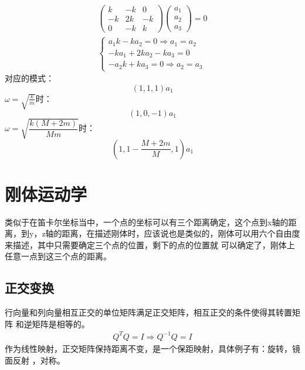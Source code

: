 \documentclass[UTF8,10pt]{article}
\begin{document}
\begin{equation*}
    \begin{array}{l}
        \left(\begin{array}{ccc}
                      k  & -k  & 0  \\
                      -k & 2 k & -k \\
                      0  & -k  & k
                  \end{array}\right)\left(\begin{array}{l}
                                              a_{1} \\
                                              a_{2} \\
                                              a_{3}
                                          \end{array}\right)=0 \\
        \left\{\begin{array}{l}
                   a_{1} k-k a_{2}=0 \Rightarrow a_{1}=a_{2} \\
                   -k a_{1}+2 k a_{2}-k a_{3}=0              \\
                   -a_{2} k+k a_{3}=0 \Rightarrow a_{2}=a_{3}
               \end{array}\right.
    \end{array}
\end{equation*}
对应的模式：$$\left(1,1,1\right)a_1$$
$\omega=\sqrt{\frac{k}{m}}$时：
$$\left(1,0,-1\right)a_1$$
$\omega=\sqrt{\dfrac{k(M+2m)}{Mm}}$时：
$$
    \left( 1,1-\frac{M+2m}{M},1\right)a_1
$$

\section{刚体运动学}
类似于在笛卡尔坐标当中，一个点的坐标可以有三个距离确定，这个点到x轴的距离，到y，z轴的距离，在描述刚体时，应该说也是类似的，刚体可以用六个自由度来描述，其中只需要确定三个点的位置，剩下的点的位置就
可以确定了，刚体上任意一点到这三个点的距离。
\subsection{正交变换}
行向量和列向量相互正交的单位矩阵满足正交矩阵，相互正交的条件使得其转置矩阵
和逆矩阵是相等的。
\begin{align*}
    Q^T Q=I\Rightarrow Q^{-1}Q =I
\end{align*}
作为线性映射，正交矩阵保持距离不变，是一个保距映射，具体例子有：旋转，镜面反射
，对称。
\end{document}
